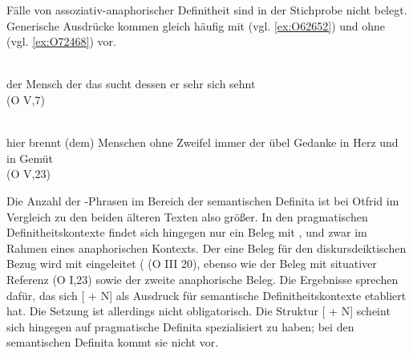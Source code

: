 
Fälle von assoziativ-anaphorischer Definitheit sind in der Stichprobe nicht belegt. Generische Ausdrücke kommen gleich häufig mit (vgl. \ref{ex:O62652}) und ohne (vgl. \ref{ex:O72468})  vor.

%

\begin{exe}
\ex \label{ex:O62652} \gll {}         \\
{der} {Mensch} {der} {das} {sucht} {dessen} {er} {sehr} {sich sehnt} \\
\glt   {} (O V,7)
\end{exe}

%

\begin{exe}
\ex \label{ex:O72468} \gll {}               \\
{hier} {brennt} {(dem) Menschen} {ohne} {Zweifel} {immer} {der} {übel} {Gedanke} {in} {Herz} {und} {in} {Gemüt} \\
\glt   {}  (O V,23)
\end{exe}

Die Anzahl der -Phrasen im Bereich der semantischen Definita ist bei Otfrid im Vergleich zu den beiden älteren Texten also größer. In den pragmatischen Definitheitskontexte findet sich hingegen nur ein Beleg mit , und zwar im Rahmen eines anaphorischen Kontexts. Der eine Beleg für den diskursdeiktischen Bezug wird mit  eingeleitet (  (O III 20), ebenso wie der Beleg mit situativer Referenz   (O I,23) sowie der zweite anaphorische Beleg. Die Ergebnisse sprechen dafür, das sich [ + N] als Ausdruck für semantische Definitheitskontexte etabliert hat. Die Setzung ist allerdings nicht obligatorisch. Die Struktur [ + N] scheint sich hingegen auf pragmatische Definita spezialisiert zu haben; bei den semantischen Definita kommt sie nicht vor.

